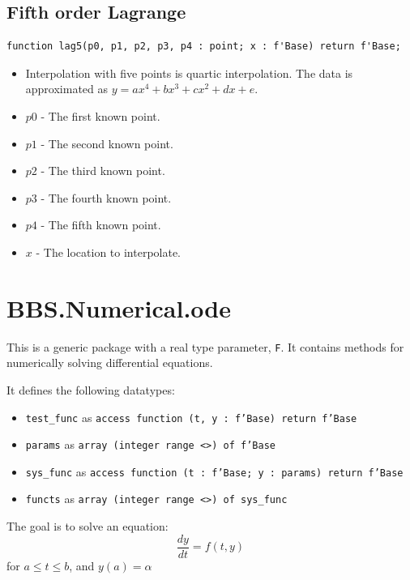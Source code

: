 \documentclass[10pt, openany]{book}
\newcommand{\indexfunc}[1]{\index[func]{#1}}
\newcommand{\datatype}[1]{\texttt{#1}}
\begin{document}
\subsection{Fifth order Lagrange}
\begin{lstlisting}
function lag5(p0, p1, p2, p3, p4 : point; x : f'Base) return f'Base;
\end{lstlisting}
\indexfunc{interp-lag5}
\begin{itemize}
  \item Interpolation with five points is quartic interpolation.  The data is approximated as $y = ax^4+bx^3+cx^2+dx+e$.
  \item $p0$ - The first known point.
  \item $p1$ - The second known point.
  \item $p2$ - The third known point.
  \item $p3$ - The fourth known point.
  \item $p4$ - The fifth known point.
  \item $x$ - The location to interpolate.
\end{itemize}

\section{BBS.Numerical.ode}
This is a generic package with a real type parameter, \datatype{F}.  It contains methods for numerically solving differential equations.

It defines the following datatypes:
\begin{itemize}
   \item \datatype{test\_func} as \datatype{access function (t, y : f'Base) return f'Base}
   \item \datatype{params} as \datatype{array (integer range <>) of f'Base}
   \item \datatype{sys\_func} as \datatype{access function (t : f'Base; y : params) return f'Base}
   \item \datatype{functs} as \datatype{array (integer range <>) of sys\_func}
\end{itemize}

The goal is to solve an equation:
\begin{displaymath}
  \frac{dy}{dt} = f(t, y)
\end{displaymath}
for $a\leq t\leq b$, and $y(a) = \alpha$
\end{document}
